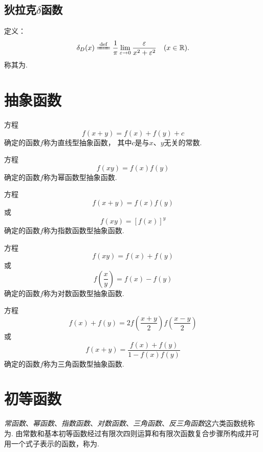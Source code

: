 \subsection{狄拉克\texorpdfstring{\(\delta\)}{\textdelta}函数}
\begin{definition}
定义：\[
	\delta_D(x)
	\defeq \frac{1}{\pi}
		\lim\limits_{\varepsilon\to0}
		\frac{\varepsilon}{x^2+\varepsilon^2}
	\quad(x\in\mathbb{R}).
\]
称其为.
\end{definition}

\section{抽象函数}
方程\[
f(x+y) = f(x) + f(y) + c
\]确定的函数\(f\)称为直线型抽象函数，%
其中\(c\)是与\(x\)、\(y\)无关的常数.

方程\[
f(xy) = f(x) f(y)
\]确定的函数\(f\)称为幂函数型抽象函数.

方程\[
f(x+y) = f(x) f(y)
\]或\[
f(xy) = [f(x)]^y
\]确定的函数\(f\)称为指数函数型抽象函数.

方程\[
f(xy) = f(x) + f(y)
\]或\[
f\left(\frac{x}{y}\right) = f(x) - f(y)
\]确定的函数\(f\)称为对数函数型抽象函数.

方程\[
f(x) + f(y) = 2 f\left(\frac{x+y}{2}\right) f\left(\frac{x-y}{2}\right)
\]或\[
f(x+y) = \frac{f(x) + f(y)}{1 - f(x) f(y)}
\]确定的函数\(f\)称为三角函数型抽象函数.

\section{初等函数}
\begin{definition}
\emph{常函数}、\emph{幂函数}、\emph{指数函数}、\emph{对数函数}、\emph{三角函数}、\emph{反三角函数}这六类函数统称为.
由常数和基本初等函数经过有限次四则运算和有限次函数复合步骤所构成并可用一个式子表示的函数，称为.
\end{definition}
